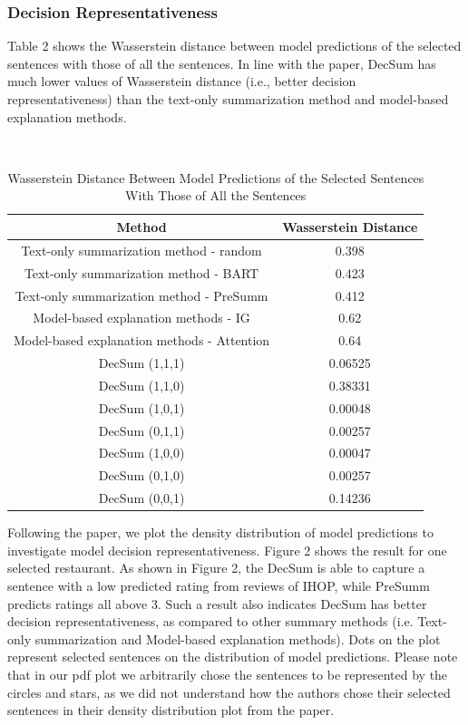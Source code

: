 \documentclass{article}
\begin{document}
\subsubsection{Decision Representativeness}
Table 2 shows the Wasserstein distance between model predictions of the selected sentences with those of all the sentences. In line with the paper, DecSum has much lower values of Wasserstein distance
(i.e., better decision representativeness) than the text-only summarization method and model-based explanation methods.

\begin{table}[ht]
    \centering
    \caption{Wasserstein Distance Between Model Predictions of the Selected Sentences With Those of All the Sentences} \\
    \begin{tabular}{|c|c|}
        \hline \textbf{Method} & \textbf{Wasserstein Distance} \\
        \hline Text-only summarization method - random & 0.398 \\
        \hline Text-only summarization method - BART & 0.423 \\
        \hline Text-only summarization method - PreSumm & 0.412 \\
        \hline Model-based explanation methods - IG & 0.62 \\
        \hline Model-based explanation methods - Attention & 0.64 \\
        \hline DecSum (1,1,1)   & 0.06525 \\
        \hline DecSum (1,1,0)   & 0.38331 \\
        \hline DecSum (1,0,1)   & 0.00048 \\
        \hline DecSum (0,1,1)   & 0.00257 \\
        \hline DecSum (1,0,0)   & 0.00047 \\
        \hline DecSum (0,1,0)   & 0.00257 \\
        \hline DecSum (0,0,1)   & 0.14236 \\ \hline
    \end{tabular}
\end{table}

Following the paper, we plot the density distribution of model predictions to investigate model decision representativeness. Figure 2 shows the result for one selected restaurant.
As shown in Figure 2, the DecSum is able to capture a sentence with a low predicted rating from reviews of IHOP, while PreSumm predicts ratings all above 3.
Such a result also indicates DecSum has better decision representativeness, as compared to other summary methods  (i.e. Text-only summarization and Model-based explanation methods).
Dots on the plot represent selected sentences on the distribution of model predictions. Please note that in our pdf plot we arbitrarily chose the sentences to be represented by the circles and stars,
as we did not understand how the authors chose their selected sentences in their density distribution plot from the paper.
\end{document}
